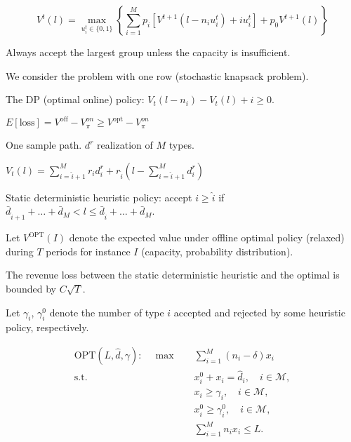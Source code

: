 \begin{equation}
    V^{t}(l) =  \max_{u_{i}^{t} \in \{0,1\}} \left\{ \sum_{i=1}^{M} p_i \left[V^{t+1}(l-n_i u_{i}^{t})+ i u_{i}^{t}\right] + p_0 V^{t+1}(l)\right\}
\end{equation}

Always accept the largest group unless the capacity is insufficient.



We consider the problem with one row (stochastic knapsack problem).

The DP (optimal online) policy: $V_{t}(l- n_{i}) - V_{t}(l) + i \geq 0$.

$E[\text{loss}] = V^{\text{off}} - V_{\pi}^{on} \geq V^{\text{opt}} - V_{\pi}^{on}$

One sample path. $d^{r}$ realization of $M$ types. 

$V_{t}(l) = \sum_{i = \hat{i}+1}^{M} r_{i} d_{i}^{r} + r_{\hat{i}}(l- \sum_{i= \hat{i}+1}^{M} d_{i}^{r})$

Static deterministic heuristic policy: accept $i \geq \hat{i}$ if $\bar{d}_{\hat{i}+1}+ \ldots + \bar{d}_{M} < l \leq \bar{d}_{\hat{i}}+ \ldots + \bar{d}_{M}$.


Let $V^{\text{OPT}}(I)$ denote the expected value under offline optimal policy (relaxed) during $T$ periods for instance $I$ (capacity, probability distribution).

The revenue loss between the static deterministic heuristic and the optimal is bounded by $C \sqrt{T}$.

Let $\gamma_{i}$, $\gamma_{i}^{0}$ denote the number of type $i$ accepted and rejected by some heuristic policy, respectively.



\begin{align*}
    \text{OPT}(L, \hat{d}, \gamma): \quad \max \quad & \sum_{i = 1}^{M} (n_i - \delta) x_{i} \\
    \text {s.t.} \quad & x_{i}^{0} + x_{i} = \hat{d}_{i}, \quad i \in \mathcal{M},  \\ 
    & x_{i} \geq \gamma_{i}, \quad i \in \mathcal{M}, \\
    & x_{i}^{0} \geq \gamma_{i}^{0}, \quad i \in \mathcal{M}, \\
    & \sum_{i=1}^{M} n_{i} x_{i} \leq L.
\end{align*}

